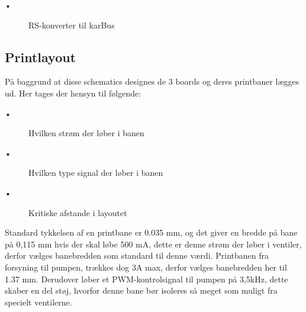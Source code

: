 \begin{description}
 \item[•] RS-konverter til karBus
\end{description}


\subsection{Printlayout}

På baggrund at disse schematics designes de 3 boards og deres printbaner lægges ud. Her tages der hensyn til følgende: 

\begin{description}
 \item[•] Hvilken strøm der løber i banen
 \item[•] Hvilken type signal der løber i banen
 \item[•] Kritiske afstande i layoutet
\end{description}

Standard tykkelsen af en printbane er 0.035 mm, og det giver en bredde på bane på 0,115 mm hvis der skal løbe 500 mA, dette er denne strøm der løber i ventiler, derfor vælges banebredden som standard til denne værdi. 
Printbanen fra forsyning til pumpen, trækkes dog 3A max, derfor vælges banebredden her til 1.37 mm. \newline
Derudover løber et PWM-kontrolsignal til pumpen på 3,5kHz, dette skaber en del støj, hvorfor denne bane bør isoleres så meget som muligt fra specielt ventilerne.
